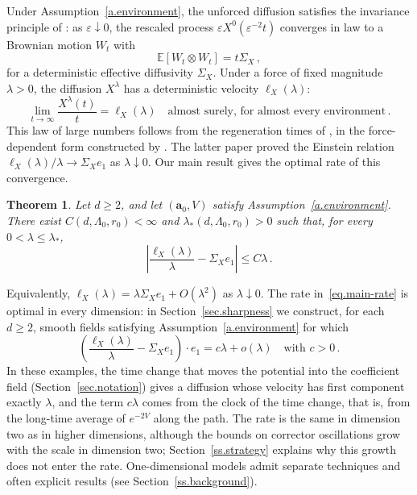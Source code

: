 \documentclass[11pt]{amsart}
\newtheorem{theorem}[proposition]{Theorem}
\theoremstyle{definition}
\theoremstyle{remark}
\numberwithin{equation}{section}
\newcommand{\E}{\mathbb E}
\renewcommand{\a}{\mathbf a}
\renewcommand{\epsilon}{\varepsilon}
\begin{document}
Under Assumption~\ref{a.environment}, the unforced diffusion satisfies the invariance principle of \citet*{DeMasiFerrariGoldsteinWick1989}: as $\epsilon\downarrow0$, the rescaled process $\epsilon X^0(\epsilon^{-2}t)$ converges in law to a Brownian motion $W_t$ with
\begin{equation*}
 \E[W_t\otimes W_t]=t\Sigma_X\, ,
\end{equation*}
for a deterministic effective diffusivity $\Sigma_X$. Under a force of fixed magnitude $\lambda>0$, the diffusion $X^\lambda$ has a deterministic velocity $\ell_X(\lambda)$:
\begin{equation}\label{eq.velocity-definition}
 \lim_{t\to\infty}\frac{X^\lambda(t)}t=\ell_X(\lambda)
 \quad\text{almost surely, for almost every environment}\, .
\end{equation}
This law of large numbers follows from the regeneration times of \citet*{ballistic2003shen,ballistic2004shen}, in the force-dependent form constructed by \citet[Section~5]{Einstein2012gantert}. The latter paper proved the Einstein relation $\ell_X(\lambda)/\lambda\to\Sigma_Xe_1$ as $\lambda\downarrow0$. Our main result gives the optimal rate of this convergence.

\begin{theorem}\label{t.main}
Let $d\geq2$, and let $(\a_0,V)$ satisfy Assumption~\ref{a.environment}. There exist $C(d,\Lambda_0,r_0)<\infty$ and $\lambda_*(d,\Lambda_0,r_0)>0$ such that, for every $0<\lambda\leq\lambda_*$,
\begin{equation}\label{eq.main-rate}
 \left|\frac{\ell_X(\lambda)}\lambda-\Sigma_Xe_1\right|
 \leq C\lambda\, .
\end{equation}
\end{theorem}

Equivalently, $\ell_X(\lambda)=\lambda\Sigma_Xe_1+O(\lambda^2)$ as $\lambda\downarrow0$. The rate in~\eqref{eq.main-rate} is optimal in every dimension: in Section~\ref{sec.sharpness} we construct, for each $d\geq2$, smooth fields satisfying Assumption~\ref{a.environment} for which
\begin{equation}\label{eq.intro-lower}
 \left(\frac{\ell_X(\lambda)}\lambda-\Sigma_Xe_1\right)\cdot e_1
 =c\lambda+o(\lambda)
 \quad\text{with }c>0\, .
\end{equation}
In these examples, the time change that moves the potential into the coefficient field (Section~\ref{sec.notation}) gives a diffusion whose velocity has first component exactly $\lambda$, and the term $c\lambda$ comes from the clock of the time change, that is, from the long-time average of $e^{-2V}$ along the path. The rate is the same in dimension two as in higher dimensions, although the bounds on corrector oscillations grow with the scale in dimension two; Section~\ref{ss.strategy} explains why this growth does not enter the rate. One-dimensional models admit separate techniques and often explicit results (see Section~\ref{ss.background}).
\end{document}
